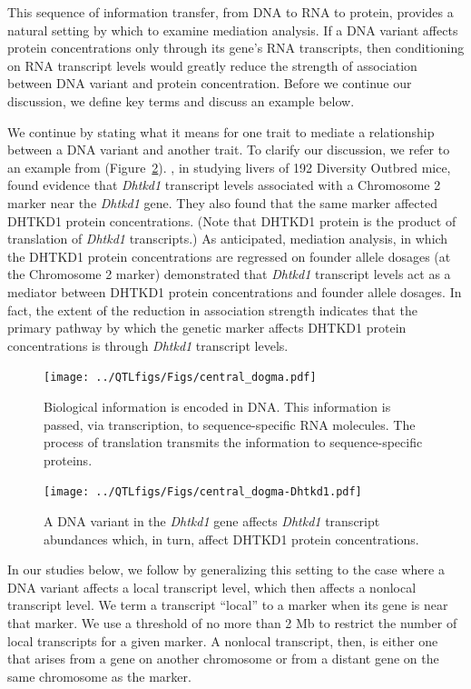 \documentclass[oneside]{book}\usepackage[]{graphicx}\usepackage[]{color}
\begin{document}
This sequence of information transfer, from DNA to RNA to protein, provides a natural 
setting by which to examine mediation analysis. If a DNA variant affects protein 
concentrations only through its gene's RNA transcripts, then conditioning on RNA transcript 
levels would greatly reduce the strength of association between DNA variant and protein 
concentration. Before we continue our discussion, we define key terms and discuss an example below. 

We continue by stating what it means for one trait to mediate a relationship between a 
DNA variant and another trait. To clarify our discussion, we refer to an example from 
\citet{chick2016defining} (Figure~\ref{fig:Dhtkd1}). \citet{chick2016defining}, in 
studying livers of 192 Diversity Outbred mice, found evidence that \emph{Dhtkd1} 
transcript levels associated with a Chromosome 2 marker near the \emph{Dhtkd1} gene. 
They also found that 
the same marker affected DHTKD1 protein concentrations. (Note that DHTKD1 protein is the product of translation of \emph{Dhtkd1} transcripts.)
As anticipated, mediation analysis, in which the DHTKD1 protein concentrations are
regressed on founder allele dosages (at the Chromosome 2 marker) demonstrated that
\emph{Dhtkd1} transcript levels act as a mediator between DHTKD1 protein concentrations 
and founder allele dosages. In fact, the extent of the reduction in association 
strength indicates that the primary pathway by which the genetic marker affects DHTKD1 
protein concentrations is through \emph{Dhtkd1} transcript levels.

\begin{figure}
  \centering
  \texttt{[image: ../QTLfigs/Figs/central\_dogma.pdf]}
  \caption{Biological information is encoded in DNA. This information is passed, via transcription, to sequence-specific RNA molecules. The process of translation transmits the information to sequence-specific proteins.}\label{fig:dogma}
\end{figure}


\begin{figure}
  \centering
  \texttt{[image: ../QTLfigs/Figs/central\_dogma-Dhtkd1.pdf]}
  \caption{A DNA variant in the \emph{Dhtkd1} gene affects \emph{Dhtkd1} transcript abundances which, in turn, affect DHTKD1 protein concentrations.}\label{fig:Dhtkd1}
\end{figure}


In our studies below, we follow \citet{keller2018genetic} by generalizing this setting to the case where a DNA variant affects a local transcript level, which then affects a nonlocal transcript level. 
We term a transcript ``local'' to a marker when its gene is near that marker. 
We use a threshold of no more than 2 Mb to restrict the 
number of local transcripts for a given marker. 
A nonlocal transcript, then, is either one that arises from a gene on another chromosome or from a distant gene on the same chromosome as the marker.
\end{document}
